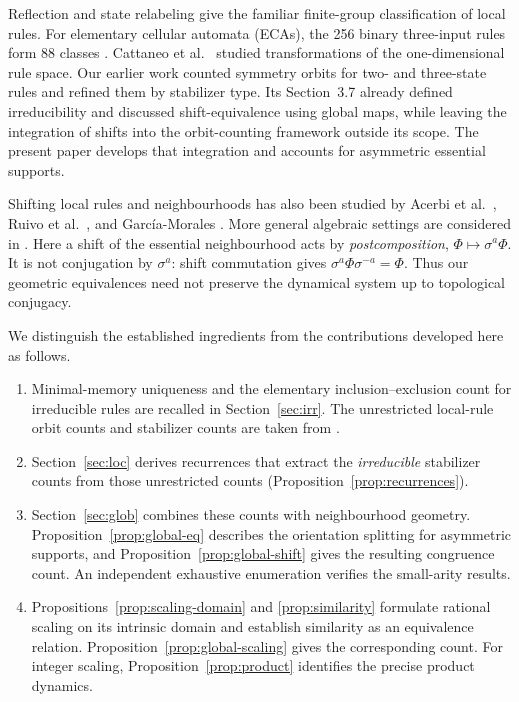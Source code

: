 \documentclass[11pt,a4paper]{article}
\newenvironment{revision}{\color{blue}}{}
\newenvironment{revision}{\color{black}}{}
\newcommand{\locmark}[1]{\label{#1}\linelabel{line:#1}}
\begin{document}
\begin{revision}
\locmark{loc:prior-work}
Reflection and state relabeling give the familiar finite-group classification
of local rules. For elementary cellular automata (ECAs), the 256 binary
three-input rules form 88 classes
\cite{wolfram-1986,Li1990TheSO}.
Cattaneo et al.\ \cite{CATTANEO19971593} studied transformations of the
one-dimensional rule space. Our earlier work
\cite{SCHALLER2025100298} counted symmetry orbits for two- and three-state
rules and refined them by stabilizer type. Its Section~3.7 already defined
irreducibility and discussed shift-equivalence using global maps, while
leaving the integration of shifts into the orbit-counting framework outside
its scope. The present paper develops that integration and accounts for
asymmetric essential supports.

Shifting local rules and neighbourhoods has also been studied by
Acerbi et al.\ \cite{10.1007/978-3-540-73001-9_1},
Ruivo et al.\ \cite{RUIVO2018280}, and
Garc{\'i}a-Morales \cite{GARCIAMORALES2013276}.
More general algebraic settings are considered in
\cite{CASTILLORAMIREZ2020104533,Castillo-Ramirez03072023}.
Here a shift of the essential neighbourhood acts by
\emph{postcomposition}, $\Phi\mapsto\sigma^a\Phi$.
It is not conjugation by $\sigma^a$: shift commutation gives
$\sigma^a\Phi\sigma^{-a}=\Phi$.
Thus our geometric equivalences need not preserve the dynamical system up
to topological conjugacy.

\locmark{loc:contributions}
We distinguish the established ingredients from the contributions developed
here as follows.
\begin{enumerate}
\item Minimal-memory uniqueness and the elementary inclusion--exclusion
count for irreducible rules are recalled in Section~\ref{sec:irr}.
The unrestricted local-rule orbit counts and stabilizer counts are taken
from \cite{SCHALLER2025100298}.
\item Section~\ref{sec:loc} derives recurrences that extract the
\emph{irreducible} stabilizer counts from those unrestricted counts
(Proposition~\ref{prop:recurrences}).
\item Section~\ref{sec:glob} combines these counts with neighbourhood
geometry. Proposition~\ref{prop:global-eq} describes the orientation
splitting for asymmetric supports, and
Proposition~\ref{prop:global-shift} gives the resulting congruence count.
An independent exhaustive enumeration verifies the small-arity results.
\item Propositions~\ref{prop:scaling-domain} and
\ref{prop:similarity} formulate rational scaling on its intrinsic domain
and establish similarity as an equivalence relation.
Proposition~\ref{prop:global-scaling} gives the corresponding count.
For integer scaling, Proposition~\ref{prop:product} identifies the precise
product dynamics.
\end{enumerate}


\end{revision}
\end{document}
